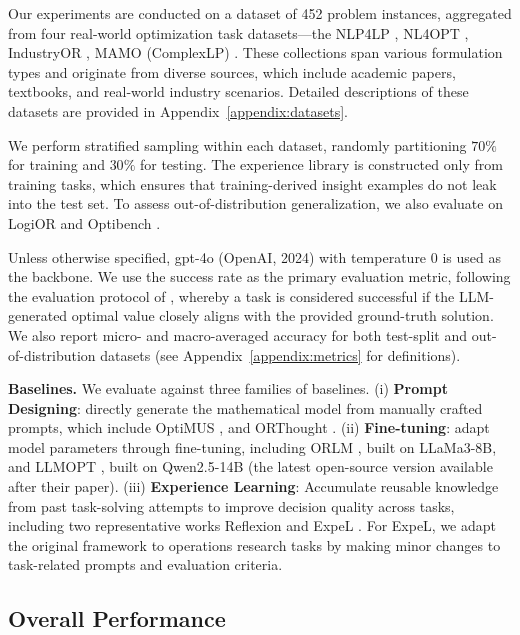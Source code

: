\documentclass[sigconf, nonacm]{acmart}
\begin{document}
Our experiments are conducted on a dataset of 452 problem instances, aggregated from four real-world optimization task datasets---the NLP4LP \citep{ahmaditeshnizi2024optimus}, NL4OPT \citep{NL4OPT}, IndustryOR \citep{huang2025orlm}, MAMO (ComplexLP) \citep{huang2024mamo}.  These collections span various formulation types and originate from diverse sources, which include academic papers, textbooks, and real‐world industry scenarios. Detailed descriptions of these datasets are provided in Appendix~\ref{appendix:datasets}.

We perform stratified sampling within each dataset, randomly partitioning $70\%$ for training and $30\%$ for testing. The experience library is constructed only from training tasks, which ensures that training-derived insight examples do not leak into the test set. To assess out-of-distribution generalization, we also evaluate on LogiOR \citep{yang2025orthought} and Optibench \citep{yang2024optibench}.

Unless otherwise specified, gpt-4o (OpenAI, 2024) with temperature 0 is used as the backbone. We use the success rate as the primary evaluation metric, following the evaluation protocol of \citet{yang2025orthought}, whereby a task is considered successful if the LLM-generated optimal value closely aligns with the provided ground-truth solution. We also report micro- and macro-averaged accuracy for both test-split and out-of-distribution datasets (see Appendix~\ref{appendix:metrics} for definitions).


\textbf{Baselines.} We evaluate against three families of baselines. (i) \textbf{Prompt Designing}: directly generate the mathematical model from manually crafted prompts, which include OptiMUS \citep{ahmaditeshnizi2024optimus}, and ORThought \citep{yang2025orthought}. (ii) \textbf{Fine-tuning}: adapt model parameters through fine-tuning, including ORLM \citep{huang2025orlm}, built on LLaMa3-8B, and LLMOPT \citep{JiangShu2025llmopt}, built on Qwen2.5-14B (the latest open-source version available after their paper). (iii) \textbf{Experience Learning}: Accumulate reusable knowledge from past task-solving attempts to improve decision quality across tasks, including two representative works Reflexion \citep{shinn2023reflexion} and ExpeL \citep{zhao2024expel}. For ExpeL, we adapt the original framework to operations research tasks by making minor changes to task-related prompts and evaluation criteria.
\subsection{Overall Performance}
\end{document}
